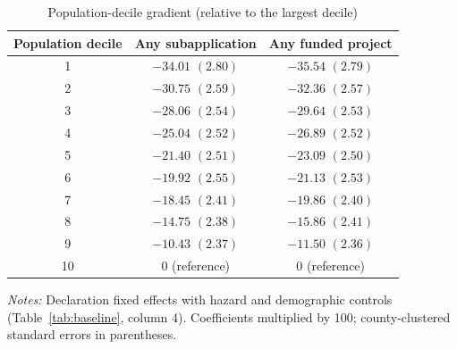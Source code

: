 \begin{table}[!htbp]
\centering
\small
\begin{threeparttable}
\caption{Population-decile gradient (relative to the largest decile)}
\label{tab:deciles}
\begin{tabular}{@{}ccc@{}}
\toprule
Population decile & Any subapplication & Any funded project \\
\midrule
1 & $-34.01$ $(2.80)$ & $-35.54$ $(2.79)$ \\
2 & $-30.75$ $(2.59)$ & $-32.36$ $(2.57)$ \\
3 & $-28.06$ $(2.54)$ & $-29.64$ $(2.53)$ \\
4 & $-25.04$ $(2.52)$ & $-26.89$ $(2.52)$ \\
5 & $-21.40$ $(2.51)$ & $-23.09$ $(2.50)$ \\
6 & $-19.92$ $(2.55)$ & $-21.13$ $(2.53)$ \\
7 & $-18.45$ $(2.41)$ & $-19.86$ $(2.40)$ \\
8 & $-14.75$ $(2.38)$ & $-15.86$ $(2.41)$ \\
9 & $-10.43$ $(2.37)$ & $-11.50$ $(2.36)$ \\
10 & 0 (reference) & 0 (reference) \\
\bottomrule
\end{tabular}
\begin{tablenotes}[flushleft]
\footnotesize
\item \textit{Notes:} Declaration fixed effects with hazard and demographic controls (Table~\ref{tab:baseline}, column 4). Coefficients multiplied by 100; county-clustered standard errors in parentheses.
\end{tablenotes}
\end{threeparttable}
\end{table}
